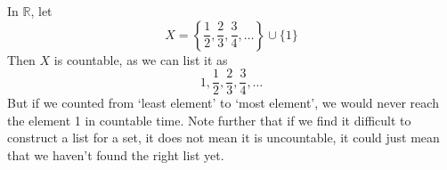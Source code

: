 \begin{remark}
	In \(\mathbb R\), let
	\[
		X = \left\{ \frac{1}{2}, \frac{2}{3}, \frac{3}{4}, \dots \right\} \cup \{ 1 \}
	\]
	Then \(X\) is countable, as we can list it as
	\[
		1, \frac{1}{2}, \frac{2}{3}, \frac{3}{4}, \dots
	\]
	But if we counted from `least element' to `most element', we would never reach the element 1 in countable time.
	Note further that if we find it difficult to construct a list for a set, it does not mean it is uncountable, it could just mean that we haven't found the right list yet.
\end{remark}
